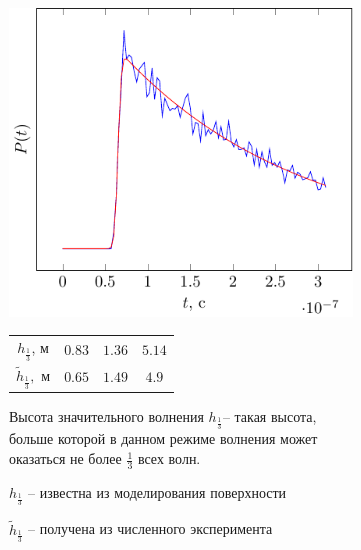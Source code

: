 \documentclass[10pt,pdf,hyperref={unicode}, dvipsnames]{beamer}
\begin{document}
\begin{frame}
\begin{figure}
\begin{subfigure}{0.42\linewidth}
    \end{subfigure}
    \hfill
    \begin{subfigure}{0.42\linewidth}
        \centering
        \includegraphics[width=1\linewidth,page=3]{fig/retracking/model}
    \end{subfigure}
    \hfill
    \begin{subfigure}{0.42\linewidth}
        \begin{tabular}{|c|c|c|c|}
            \hline
            $h_{\frac{1}{3}}$, м      & $0.83$ & $1.36$ & $5.14$\\
            $\tilde h_{\frac{1}{3}},$ м & $0.65$ & $1.49$ & $4.9$\\
            \hline
        \end{tabular}

        \vspace{\baselineskip}

        \footnotesize
        Высота значительного волнения $h_{\frac{1}{3}}$-- 
        такая высота, больше которой в данном режиме волнения может оказаться
        не более $\frac{1}{3}$ всех волн.

        $h_{\frac{1}{3}}$ -- известна из  моделирования поверхности

        $\tilde h_{\frac{1}{3}}$ -- получена из численного эксперимента

    \end{subfigure}

\end{figure}
\end{frame}
\end{document}
